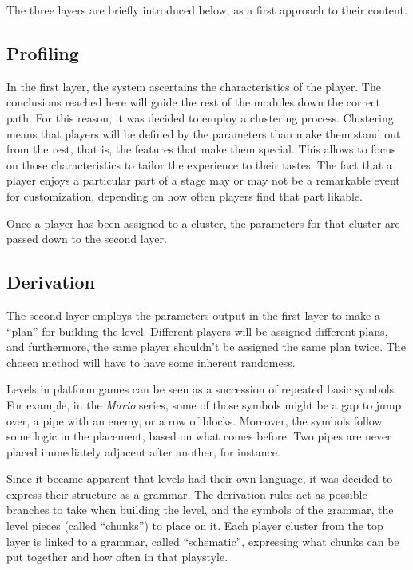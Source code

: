 \documentclass[conference]{IEEEtran}
\begin{document}
The three layers are briefly introduced below, as a first approach to their content.

\subsection{Profiling}

In the first layer, the system ascertains the characteristics of the player. The conclusions reached here will guide the rest of the modules down the correct path. For this reason, it was decided to employ a clustering process. Clustering means that players will be defined by the parameters than make them stand out from the rest, that is, the features that make them special. This allows to focus on those characteristics to tailor the experience to their tastes. The fact that a player enjoys a particular part of a stage may or may not be a remarkable event for customization, depending on how often players find that part likable.

Once a player has been assigned to a cluster, the parameters for that cluster are passed down to the second layer.

\subsection{Derivation}

The second layer employs the parameters output in the first layer to make a ``plan'' for building the level. Different players will be assigned different plans, and furthermore, the same player shouldn't be assigned the same plan twice. The chosen method will have to have some inherent randomess.

Levels in platform games can be seen as a succession of repeated basic symbols. For example, in the \textit{Mario} series, some of those symbols might be a gap to jump over, a pipe with an enemy, or a row of blocks. Moreover, the symbols follow some logic in the placement, based on what comes before. Two pipes are never placed immediately adjacent after another, for instance.

Since it became apparent that levels had their own language, it was decided to express their structure as a grammar. The derivation rules act as possible branches to take when building the level, and the symbols of the grammar, the level pieces (called ``chunks'') to place on it. Each player cluster from the top layer is linked to a grammar, called ``schematic'', expressing what chunks can be put together and how often in that playstyle. 
\end{document}
